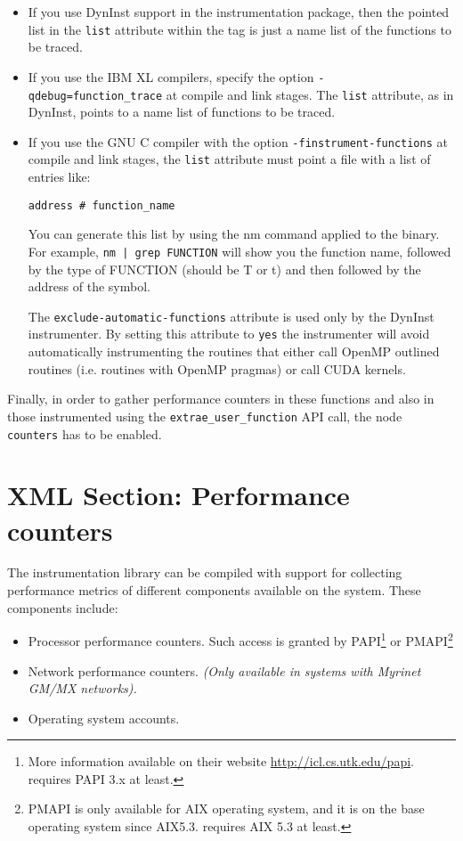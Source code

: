 \begin{itemize}
 \item If you use DynInst support in the instrumentation package, then the pointed list in the {\tt list} attribute within the tag is just a name list of the functions to be traced.

 \item If you use the IBM XL compilers, specify the option {\tt -qdebug=function\_trace} at compile and link stages. The {\tt list} attribute, as in DynInst, points to a name list of functions to be traced.

 \item If you use the GNU C compiler with the option {\tt -finstrument-functions} at compile and link stages, the {\tt list} attribute must point a file with a list of entries like:

{\tt address \# function\_name}

You can generate this list by using the nm command applied to the binary. For example, {\tt nm | grep FUNCTION} will show you the function name, followed by the type of FUNCTION (should be T or t) and then followed by the address of the symbol.

The {\tt exclude-automatic-functions} attribute is used only by the DynInst instrumenter. By setting this attribute to {\tt yes} the instrumenter will avoid automatically instrumenting the routines that either call OpenMP outlined routines (i.e. routines with OpenMP pragmas) or call CUDA kernels.
\end{itemize}

Finally, in order to gather performance counters in these functions and also in those instrumented using the {\tt extrae\_user\_function} API call, the node {\tt counters} has to be enabled.


\section{XML Section: Performance counters}\label{sec:XMLSectionPerformanceCounters}

The instrumentation library can be compiled with support for collecting performance metrics of different components available on the system. These components include:

\begin{itemize}
 \item Processor performance counters. Such access is granted by PAPI\footnote{More information available on their website \url{http://icl.cs.utk.edu/papi}. \TRACE requires PAPI 3.x at least.} or PMAPI\footnote{PMAPI is only available for AIX operating system, and it is on the base operating system since AIX5.3. \TRACE requires AIX 5.3 at least.}
 \item Network performance counters. {\em (Only available in systems with Myrinet GM/MX networks).}
 \item Operating system accounts.
\end{itemize}

